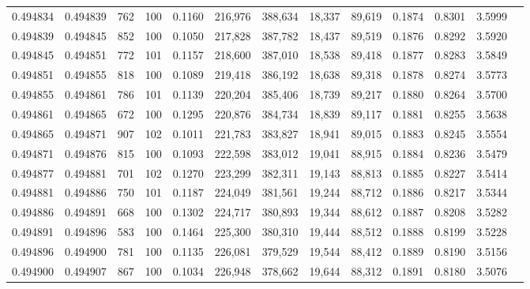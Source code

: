 \begin{tabular}{rrrrrrrrrrrrr}
0.494834 & 0.494839 &   762 & 100 &                                     0.1160 & 216,976 & 388,634 &  18,337 &  89,619 & 0.1874 & 0.8301 & 3.5999 \\
0.494839 & 0.494845 &   852 & 100 &                                     0.1050 & 217,828 & 387,782 &  18,437 &  89,519 & 0.1876 & 0.8292 & 3.5920 \\
0.494845 & 0.494851 &   772 & 101 &                                     0.1157 & 218,600 & 387,010 &  18,538 &  89,418 & 0.1877 & 0.8283 & 3.5849 \\
0.494851 & 0.494855 &   818 & 100 &                                     0.1089 & 219,418 & 386,192 &  18,638 &  89,318 & 0.1878 & 0.8274 & 3.5773 \\
0.494855 & 0.494861 &   786 & 101 &                                     0.1139 & 220,204 & 385,406 &  18,739 &  89,217 & 0.1880 & 0.8264 & 3.5700 \\
0.494861 & 0.494865 &   672 & 100 &                                     0.1295 & 220,876 & 384,734 &  18,839 &  89,117 & 0.1881 & 0.8255 & 3.5638 \\
0.494865 & 0.494871 &   907 & 102 &                                     0.1011 & 221,783 & 383,827 &  18,941 &  89,015 & 0.1883 & 0.8245 & 3.5554 \\
0.494871 & 0.494876 &   815 & 100 &                                     0.1093 & 222,598 & 383,012 &  19,041 &  88,915 & 0.1884 & 0.8236 & 3.5479 \\
0.494877 & 0.494881 &   701 & 102 &                                     0.1270 & 223,299 & 382,311 &  19,143 &  88,813 & 0.1885 & 0.8227 & 3.5414 \\
0.494881 & 0.494886 &   750 & 101 &                                     0.1187 & 224,049 & 381,561 &  19,244 &  88,712 & 0.1886 & 0.8217 & 3.5344 \\
0.494886 & 0.494891 &   668 & 100 &                                     0.1302 & 224,717 & 380,893 &  19,344 &  88,612 & 0.1887 & 0.8208 & 3.5282 \\
0.494891 & 0.494896 &   583 & 100 &                                     0.1464 & 225,300 & 380,310 &  19,444 &  88,512 & 0.1888 & 0.8199 & 3.5228 \\
0.494896 & 0.494900 &   781 & 100 &                                     0.1135 & 226,081 & 379,529 &  19,544 &  88,412 & 0.1889 & 0.8190 & 3.5156 \\
0.494900 & 0.494907 &   867 & 100 &                                     0.1034 & 226,948 & 378,662 &  19,644 &  88,312 & 0.1891 & 0.8180 & 3.5076 \\

\end{tabular}
